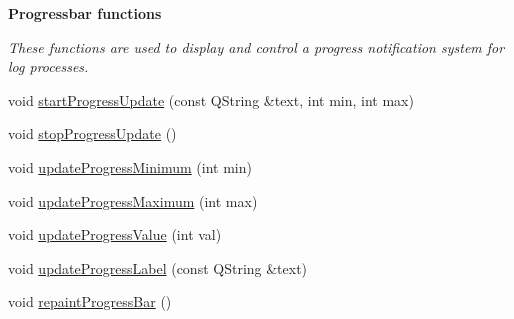 \begin{Indent}{\bf Progressbar functions}\par
{\em These functions are used to display and control a progress notification system for log processes. }\begin{DoxyCompactItemize}
\item 
void \hyperlink{classGlobalSearch_1_1AbstractDialog_ac2b3d31770c83a49b8d817a857ef377e}{start\+Progress\+Update} (const Q\+String \&text, int min, int max)
\item 
void \hyperlink{classGlobalSearch_1_1AbstractDialog_a5159109a62a0d755a6d201bce5ab6466}{stop\+Progress\+Update} ()
\item 
void \hyperlink{classGlobalSearch_1_1AbstractDialog_a37d58a75a23e7082963937caba89e47f}{update\+Progress\+Minimum} (int min)
\item 
void \hyperlink{classGlobalSearch_1_1AbstractDialog_aeadfeb3807fd25918136263e13634827}{update\+Progress\+Maximum} (int max)
\item 
void \hyperlink{classGlobalSearch_1_1AbstractDialog_a33bc475a9faf3f8307beaa2b20bf3c1c}{update\+Progress\+Value} (int val)
\item 
void \hyperlink{classGlobalSearch_1_1AbstractDialog_a74180c40bc787fae62909aa3cde450a3}{update\+Progress\+Label} (const Q\+String \&text)
\item 
void \hyperlink{classGlobalSearch_1_1AbstractDialog_a2b2e126bf000fb92e962f1c4db71a231}{repaint\+Progress\+Bar} ()
\end{DoxyCompactItemize}
\end{Indent}
